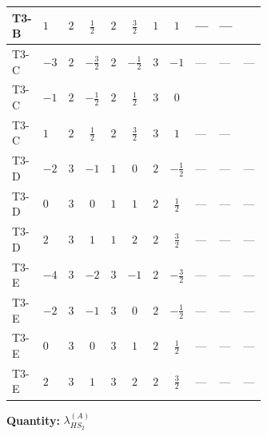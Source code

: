 \documentclass[8pt]{article}
\begin{document}
\begin{landscape}
\begin{longtable}{@{}llcccccc >{\raggedright\arraybackslash}p{0.21\linewidth} >{\raggedright\arraybackslash}p{0.21\linewidth} >{\raggedright\arraybackslash}p{0.21\linewidth}@{}}
\midrule
T3-B & $1$ & $2$ & $\frac{1}{2}$ & $2$ & $\frac{3}{2}$ & $1$ & $1$ & --- & --- & \scriptsize\adjustbox{max width=\linewidth}{$\begin{gathered} +{g_1}^2 \left(18 {g_2}^2-15 {\lambda_{HS_2}^{(A)}}\right)\end{gathered}$} \\
\midrule
T3-C & $-3$ & $2$ & $-\frac{3}{2}$ & $2$ & $-\frac{1}{2}$ & $3$ & $-1$ & --- & --- & --- \\
\midrule
T3-C & $-1$ & $2$ & $-\frac{1}{2}$ & $2$ & $\frac{1}{2}$ & $3$ & $0$ & \scriptsize\adjustbox{max width=\linewidth}{$\begin{gathered} -4 {\lambda_{10}} \left({\lambda_{H H^\dagger S_1^\dagger S_2^\dagger}^{\rm Cross}}\right)^{*}\end{gathered}$} & \scriptsize\adjustbox{max width=\linewidth}{$\begin{gathered} +64 {\lambda_{8}} \left({\lambda_{8}}\right)^{*}\end{gathered}$} & \scriptsize\adjustbox{max width=\linewidth}{$\begin{gathered} +{g_1}^2 \left(6 {g_2}^2-3 {\lambda_{HS_2}^{(A)}}\right)\end{gathered}$} \\
\midrule
T3-C & $1$ & $2$ & $\frac{1}{2}$ & $2$ & $\frac{3}{2}$ & $3$ & $1$ & --- & --- & \scriptsize\adjustbox{max width=\linewidth}{$\begin{gathered} +{g_1}^2 \left(18 {g_2}^2-15 {\lambda_{HS_2}^{(A)}}\right)\end{gathered}$} \\
\midrule
T3-D & $-2$ & $3$ & $-1$ & $1$ & $0$ & $2$ & $-\frac{1}{2}$ & --- & --- & --- \\
\midrule
T3-D & $0$ & $3$ & $0$ & $1$ & $1$ & $2$ & $\frac{1}{2}$ & --- & --- & --- \\
\midrule
T3-D & $2$ & $3$ & $1$ & $1$ & $2$ & $2$ & $\frac{3}{2}$ & --- & --- & --- \\
\midrule
T3-E & $-4$ & $3$ & $-2$ & $3$ & $-1$ & $2$ & $-\frac{3}{2}$ & --- & --- & --- \\
\midrule
T3-E & $-2$ & $3$ & $-1$ & $3$ & $0$ & $2$ & $-\frac{1}{2}$ & --- & --- & --- \\
\midrule
T3-E & $0$ & $3$ & $0$ & $3$ & $1$ & $2$ & $\frac{1}{2}$ & --- & --- & --- \\
\midrule
T3-E & $2$ & $3$ & $1$ & $3$ & $2$ & $2$ & $\frac{3}{2}$ & --- & --- & --- \\
\midrule
\bottomrule
\end{longtable}
\clearpage
\noindent\textbf{Quantity: }$\lambda_{HS_2}^{(A)}$\par\smallskip

\end{landscape}
\end{document}
